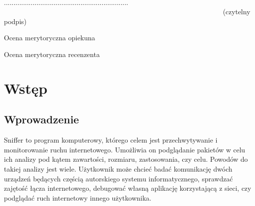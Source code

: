 \documentclass[a4paper, 12pt, twoside, openright]{article}
\begin{document}
\begin{center}

~~~~~~~~~~~~~~~~~~~~~~~~~~~~~~~~~~~~~~~~~~~~~~~~~~~~~~~~~~~~~~~~~ 
................................................................. \\
~~~~~~~~~~~~~~~~~~~~~~~~~~~~~~~~~~~~~~~~~~~~~~~~~~~~~~~~~~~~~~~  {\sf (czytelny podpis)} \\

\end{center}



\newpage
\linespread{1.3}
\selectfont

\hspace*{\fill}\large{Ocena merytoryczna opiekuna}

\vspace{85mm}

\newpage
\linespread{1.3}
\selectfont

\hspace*{\fill}\large{Ocena merytoryczna recenzenta}

\vspace{85mm}


\newpage
\tableofcontents


\newpage
\section{Wstęp}

	\subsection{Wprowadzenie}
	\indent\par
	Sniffer to program komputerowy, którego celem jest przechwytywanie i monitorowanie ruchu internetowego. Umożliwia on
	podglądanie pakietów w celu ich analizy pod kątem zawartości, rozmiaru, zastosowania, czy celu. Powodów do takiej
	analizy jest wiele. Użytkownik może chcieć badać komunikację dwóch urządzeń będących częścią autorskiego systemu
	informatycznego, sprawdzać zajętość łącza internetowego, debugować własną aplikację korzystającą z sieci, czy podglądać
	ruch internetowy innego użytkownika.
\end{document}
